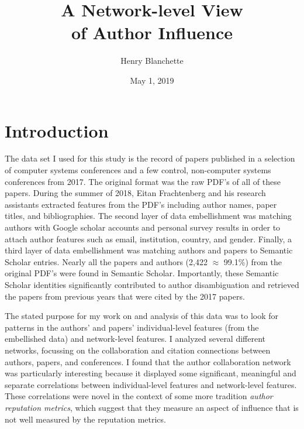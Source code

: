 \documentclass{article}
\title{\sc A Network-level View \\ of Author Influence}
\author{Henry Blanchette}
\date{May 1, 2019}
\renewcommand{\it}{\textit}
\begin{document}

\maketitle


\section{Introduction}
\label{sec:introduction}

The data set I used for this study is the record of papers published in a selection of computer systems conferences and a few control, non-computer systems conferences from 2017.
The original format was the raw PDF's of all of these papers.
During the summer of 2018, Eitan Frachtenberg
 and his research assistants extracted features from the PDF's including author names, paper titles, and bibliographies.
The second layer of data embellishment was matching authors with Google scholar accounts and personal survey results in order to attach author features such as email, institution, country, and gender.
Finally, a third layer of data embellishment was matching authors and papers to Semantic Scholar entries.
Nearly all the papers and authors (2,422 $\approx$ 99.1\%) from the original PDF's were found in Semantic Scholar.
Importantly, these Semantic Scholar identities significantly contributed to author disambiguation and retrieved the papers from previous years that were cited by the 2017 papers.

The stated purpose for my work on and analysis of this data was to look for patterns in the authors' and papers' individual-level features (from the embellished data) and network-level features.
I analyzed several different networks, focussing on the collaboration and citation connections between authors, papers, and conferences.
I found that the author collaboration network was particularly interesting because it displayed some significant, meaningful and separate correlations between individual-level features and network-level features.
These correlations were novel in the context of some more tradition \it{author reputation metrics}, which suggest that they measure an aspect of influence that is not well measured by the reputation metrics.
\end{document}

